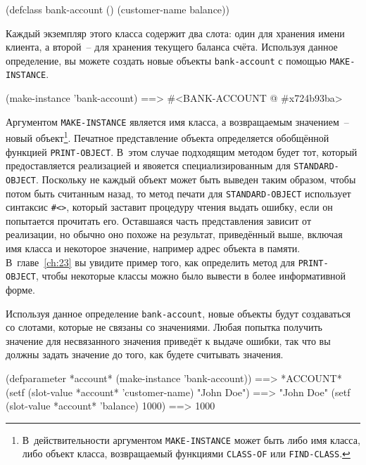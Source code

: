 \begin{myverb}
(defclass bank-account ()
  (customer-name
   balance))
\end{myverb}

Каждый экземпляр этого класса содержит два слота: один для хранения имени клиента, а
второй~-- для хранения текущего баланса счёта.  Используя данное определение, вы можете
создать новые объекты \lstinline{bank-account} с помощью \lstinline{MAKE-INSTANCE}.

\begin{myverb}
(make-instance 'bank-account) ==> #<BANK-ACCOUNT @ #x724b93ba>
\end{myverb}

Аргументом \lstinline{MAKE-INSTANCE} является имя класса, а возвращаемым значением~-- новый
объект\footnote{В~действительности аргументом \lstinline{MAKE-INSTANCE} может быть либо имя
  класса, либо объект класса, возвращаемый функциями \lstinline{CLASS-OF} или
  \lstinline{FIND-CLASS}.}\hspace{\footnotenegspace}.  Печатное представление объекта определяется обобщённой функцией
\lstinline{PRINT-OBJECT}.  В~этом случае подходящим методом будет тот, который предоставляется
реализацией и явояется специализированным для \lstinline{STANDARD-OBJECT}.  Поскольку не каждый объект
может быть выведен таким образом, чтобы потом быть считанным назад, то метод печати для
\lstinline{STANDARD-OBJECT} использует синтаксис \lstinline!#<>!, который заставит процедуру
чтения выдать ошибку, если он попытается прочитать его.  Оставшаяся часть представления
зависит от реализации, но обычно оно похоже на результат, приведённый выше, включая имя
класса и некоторое значение, например адрес объекта в памяти.  В~главе~\ref{ch:23} вы
увидите пример того, как определить метод для \lstinline{PRINT-OBJECT}, чтобы некоторые классы
можно было вывести в более информативной форме.

Используя данное определение \lstinline{bank-account}, новые объекты будут создаваться со
слотами, которые не связаны со значениями.  Любая попытка получить значение для
несвязанного значения приведёт к выдаче ошибки, так что вы должны задать значение до того,
как будете считывать значения.

\begin{myverb}
(defparameter *account* (make-instance 'bank-account))  ==> *ACCOUNT*
(setf (slot-value *account* 'customer-name) "John Doe") ==> "John Doe"
(setf (slot-value *account* 'balance) 1000)             ==> 1000
\end{myverb}

